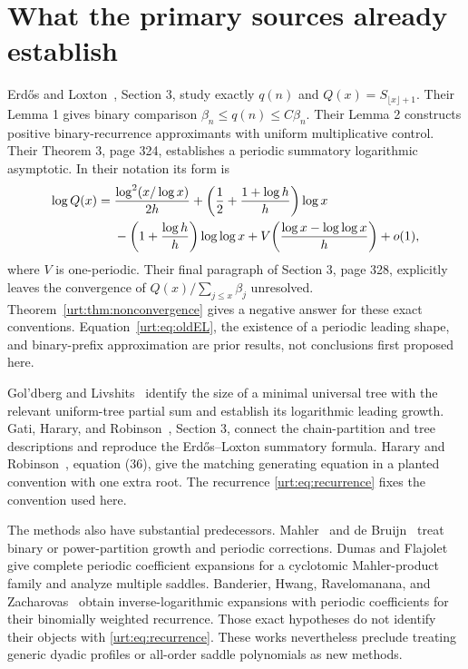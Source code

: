 \documentclass[11pt,letterpaper]{article}
\theoremstyle{remark}\newtheorem{remark}[theorem]{Remark}
\begin{document}
\section{What the primary sources already establish}\label{urt:sec:sources}
Erd\H{o}s and Loxton~\cite{el}, Section 3, study exactly $q(n)$ and $Q(x)=S_{\lfloor x\rfloor+1}$. Their Lemma 1 gives binary comparison $\beta_n\le q(n)\le C\beta_n$. Their Lemma 2 constructs positive binary-recurrence approximants with uniform multiplicative control. Their Theorem 3, page 324, establishes a periodic summatory logarithmic asymptotic. In their notation its form is
\begin{align}
 \log Q(x)={}&\frac{\log^2(x/\log x)}{2h}
 +\left(\frac12+\frac{1+\log h}{h}\right)\log x\notag\\
 &-\left(1+\frac{\log h}{h}\right)\log\log x
 +V\!\left(\frac{\log x-\log\log x}{h}\right)+o(1),\label{urt:eq:oldEL}
\end{align}
where $V$ is one-periodic. Their final paragraph of Section 3, page 328, explicitly leaves the convergence of $Q(x)/\sum_{j\le x}\beta_j$ unresolved. Theorem~\ref{urt:thm:nonconvergence} gives a negative answer for these exact conventions. Equation~\eqref{urt:eq:oldEL}, the existence of a periodic leading shape, and binary-prefix approximation are prior results, not conclusions first proposed here.

Gol'dberg and Livshits~\cite{gl} identify the size of a minimal universal tree with the relevant uniform-tree partial sum and establish its logarithmic leading growth. Gati, Harary, and Robinson~\cite{ghr}, Section 3, connect the chain-partition and tree descriptions and reproduce the Erd\H{o}s--Loxton summatory formula. Harary and Robinson~\cite{hr}, equation (36), give the matching generating equation in a planted convention with one extra root. The recurrence \eqref{urt:eq:recurrence} fixes the convention used here.

The methods also have substantial predecessors. Mahler~\cite{mahler} and de Bruijn~\cite{debruijn} treat binary or power-partition growth and periodic corrections. Dumas and Flajolet~\cite{df} give complete periodic coefficient expansions for a cyclotomic Mahler-product family and analyze multiple saddles. Banderier, Hwang, Ravelomanana, and Zacharovas~\cite{bhrz} obtain inverse-logarithmic expansions with periodic coefficients for their binomially weighted recurrence. Those exact hypotheses do not identify their objects with \eqref{urt:eq:recurrence}. These works nevertheless preclude treating generic dyadic profiles or all-order saddle polynomials as new methods.
\end{document}
